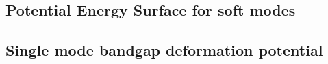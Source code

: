 \subsection{Potential Energy Surface for soft modes}


\subsection{Single mode bandgap deformation potential}

